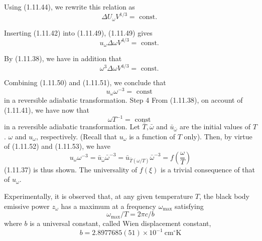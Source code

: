 \documentclass{article}
\begin{document}
Using (1.11.44), we rewrite this relation as
$$
\begin{equation*}
\Delta U_{\omega} V^{1 / 3}=\text { const. } \tag{1.11.49}
\end{equation*}
$$

Inserting (1.11.42) into (1.11.49), (1.11.49) gives
$$
\begin{equation*}
u_{\omega} \Delta \omega V^{4 / 3}=\text { const. } \tag{1.11.50}
\end{equation*}
$$

By (1.11.38), we have in addition that
$$
\begin{equation*}
\omega^{3} \Delta \omega V^{4 / 3}=\text { const. } \tag{1.11.51}
\end{equation*}
$$

Combining (1.11.50) and (1.11.51), we conclude that
$$
\begin{equation*}
u_{\omega} \omega^{-3}=\text { const } \tag{1.11.52}
\end{equation*}
$$
in a reversible adiabatic transformation.
Step 4 From (1.11.38), on account of (1.11.41), we have now that
$$
\begin{equation*}
\omega T^{-1}=\text { const } \tag{1.11.53}
\end{equation*}
$$
in a reversible adiabatic transformation. Let $\bar{T}, \bar{\omega}$ and $\bar{u}_{\bar{\omega}}$ are the initial values of $T$. $\omega$ and $u_{\omega}$, respectively. (Recall that $u_{\omega}$ is a function of $T$ only). Then, by virtue of (1.11.52) and (1.11.53), we have
$$
\begin{equation*}
u_{\omega} \omega^{-3}=\bar{u}_{\bar{\omega}} \bar{\omega}^{-3}=\bar{u}_{\bar{T}(\omega / T)} \bar{\omega}^{-3}=f\left(\frac{\omega}{T}\right) \tag{1.11.54}
\end{equation*}
$$
(1.11.37) is thus shown. The universality of $f(\xi)$ is a trivial consequence of that of $u_{\omega}$.

Experimentally, it is observed that, at any given temperature $T$, the black body emissive power $z_{\omega}$ has a maximum at a frequency $\omega_{\max }$ satisfying
$$
\begin{equation*}
\omega_{\max } / T=2 \pi c / b \tag{1.11.55}
\end{equation*}
$$
where $b$ is a universal constant, called Wien displacement constant,
$$
\begin{equation*}
b=2.8977685(51) \times 10^{-1} \mathrm{~cm}^{\circ} \mathrm{K} \tag{1.11.56}
\end{equation*}
$$
\end{document}
